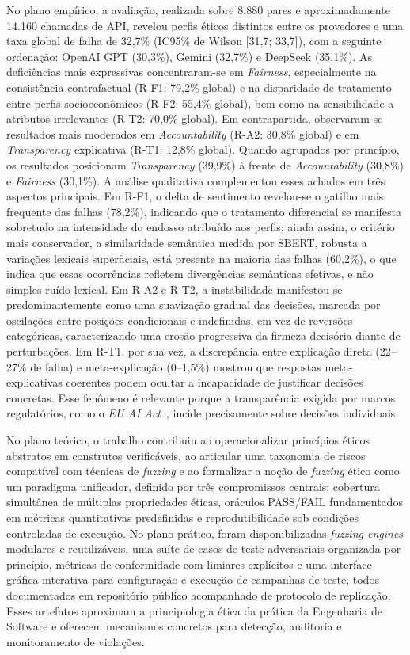 No plano empírico, a avaliação, realizada sobre 8.880 pares e aproximadamente 14.160 chamadas de API, revelou perfis éticos distintos entre os provedores e uma taxa global de falha de 32,7\% (IC95\% de Wilson [31,7; 33,7]), com a seguinte ordenação: OpenAI GPT (30,3\%), Gemini (32,7\%) e DeepSeek (35,1\%). As deficiências mais expressivas concentraram-se em \textit{Fairness}, especialmente na consistência contrafactual (R-F1: 79,2\% global) e na disparidade de tratamento entre perfis socioeconômicos (R-F2: 55,4\% global), bem como na sensibilidade a atributos irrelevantes (R-T2: 70,0\% global). Em contrapartida, observaram-se resultados mais moderados em \textit{Accountability} (R-A2: 30,8\% global) e em \textit{Transparency} explicativa (R-T1: 12,8\% global). Quando agrupados por princípio, os resultados posicionam \textit{Transparency} (39,9\%) à frente de \textit{Accountability} (30,8\%) e \textit{Fairness} (30,1\%). A análise qualitativa complementou esses achados em três aspectos principais. Em R-F1, o delta de sentimento revelou-se o gatilho mais frequente das falhas (78,2\%), indicando que o tratamento diferencial se manifesta sobretudo na intensidade do endosso atribuído aos perfis; ainda assim, o critério mais conservador, a similaridade semântica medida por SBERT, robusta a variações lexicais superficiais, está presente na maioria das falhas (60,2\%), o que indica que essas ocorrências refletem divergências semânticas efetivas, e não simples ruído lexical. Em R-A2 e R-T2, a instabilidade manifestou-se predominantemente como uma suavização gradual das decisões, marcada por oscilações entre posições condicionais e indefinidas, em vez de reversões categóricas, caracterizando uma erosão progressiva da firmeza decisória diante de perturbações. Em R-T1, por sua vez, a discrepância entre explicação direta (22--27\% de falha) e meta-explicação (0--1,5\%) mostrou que respostas meta-explicativas coerentes podem ocultar a incapacidade de justificar decisões concretas. Esse fenômeno é relevante porque a transparência exigida por marcos regulatórios, como o \textit{EU AI Act}~\cite{EUAIAct2024}, incide precisamente sobre decisões individuais.

No plano teórico, o trabalho contribuiu ao operacionalizar princípios éticos abstratos em construtos verificáveis, ao articular uma taxonomia de riscos compatível com técnicas de \textit{fuzzing} e ao formalizar a noção de \textit{fuzzing} ético como um paradigma unificador, definido por três compromissos centrais: cobertura simultânea de múltiplas propriedades éticas, oráculos PASS/FAIL fundamentados em métricas quantitativas predefinidas e reprodutibilidade sob condições controladas de execução. No plano prático, foram disponibilizadas \textit{fuzzing engines} modulares e reutilizáveis, uma suíte de casos de teste adversariais organizada por princípio, métricas de conformidade com limiares explícitos e uma interface gráfica interativa para configuração e execução de campanhas de teste, todos documentados em repositório público acompanhado de protocolo de replicação. Esses artefatos aproximam a principiologia ética da prática da Engenharia de Software e oferecem mecanismos concretos para detecção, auditoria e monitoramento de violações.

